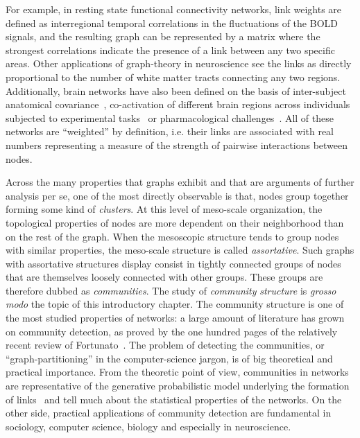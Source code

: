 For example, in resting state functional connectivity networks, link weights are defined as interregional temporal correlations in the fluctuations of the BOLD signals, and the resulting graph can be represented by a matrix where the strongest correlations indicate the presence of a link between any two specific areas.
Other applications of graph-theory in neuroscience see the links as directly proportional to the number of white matter tracts connecting any two regions.
Additionally, brain networks have also been defined on the basis of inter-subject anatomical covariance~\cite{Evans2013}, co-activation of different brain regions across individuals subjected to experimental tasks~\cite{crossley2013a} or pharmacological challenges~\cite{Schwarz2007,schwarz2008}.
All of these networks are ``weighted'' by definition, i.e. their links are associated with real numbers representing a measure of the strength of pairwise interactions between nodes. 

Across the many properties that graphs exhibit and that are arguments of further analysis per se, one of the most directly observable is that, nodes group together forming some kind of \emph{clusters}.
At this level of meso-scale organization, the topological properties of nodes are more dependent on their neighborhood than on the rest of the graph. When the mesoscopic structure tends to group nodes with similar properties, the meso-scale structure is called \emph{assortative}. Such graphs with assortative structures display consist in tightly connected groups of nodes that are themselves loosely connected with other groups. These groups are therefore dubbed as \emph{communities}. The study of \emph{community} \emph{structure} is \emph{grosso} \emph{modo} the topic of this introductory chapter.
\bigbreak
The community structure is one of the most studied properties of networks: a large amount of literature has grown on community detection, as proved by the one hundred pages of the relatively recent review of Fortunato~\cite{fortunato2010}.
The problem of detecting the communities, or ``graph-partitioning'' in the computer-science jargon, is of big theoretical and practical importance.
From the theoretic point of view, communities in networks are representative of the generative probabilistic model underlying the formation of links~\cite{Karrer2011} and tell much about the statistical properties of the networks.
On the other side, practical applications of community detection are fundamental in sociology, computer science, biology and especially in neuroscience.


